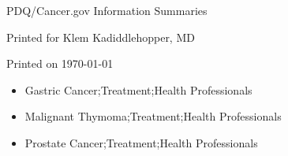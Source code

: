 \documentclass[letterpaper,12pt]{letter}
\begin{document}
\thispagestyle{empty}

PDQ\textregistered/Cancer.gov Information Summaries

\vspace{6pt}

Printed for Klem Kadiddlehopper, MD

\vspace{6pt}

Printed on \today \\

\begin{itemize}
 \item Gastric Cancer;Treatment;Health Professionals
 \item Malignant Thymoma;Treatment;Health Professionals
 \item Prostate Cancer;Treatment;Health Professionals
\end{itemize}
\vfill
\end{document}
